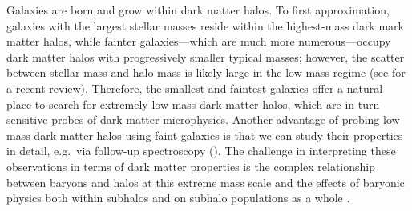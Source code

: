 Galaxies are born and grow within dark matter halos.
To first approximation, galaxies with the largest stellar masses reside within the highest-mass dark mark matter halos, while fainter galaxies---which are much more numerous---occupy dark matter halos with progressively smaller typical masses; however, the scatter between stellar mass and halo mass is likely large in the low-mass regime (see \citealt{Wechsler:2018} for a recent review).
Therefore, the smallest and faintest galaxies offer a natural place to search for extremely low-mass dark matter halos, which are in turn sensitive probes of dark matter microphysics. Another advantage of probing low-mass dark matter halos using faint galaxies is that we can study their properties in detail, e.g.\ via follow-up spectroscopy (). The challenge in interpreting these observations in terms of dark matter properties is the complex relationship between baryons and halos at this extreme mass scale and the effects of baryonic physics both within subhalos and on subhalo populations as a whole \citep[e.g.,][]{DOnghia:2009xhq,Brooks:2012ah,errani2017,Garrison-Kimmel:2017zes,Fitts:2018ycl,brooks2018}.


